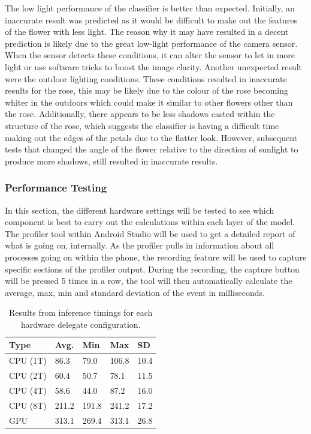 \documentclass{article}
\begin{document}
The low light performance of the classifier is better than expected. Initially, an inaccurate result was predicted as it
would be difficult to make out the features of the flower with less light. The reason why it may have resulted in a 
decent prediction is likely due to the great low-light performance of the camera sensor. When the sensor detects these 
conditions, it can alter the sensor to let in more light or use software tricks to boost the image clarity. Another 
unexpected result were the outdoor lighting conditions. These conditions resulted in inaccurate results for the rose, 
this may be likely due to the colour of the rose becoming whiter in the outdoors which could make it similar to other 
flowers other than the rose. Additionally, there appears to be less shadows casted within the structure of the rose, 
which suggests the classifier is having a difficult time making out the edges of the petals due to the flatter look. 
However, subsequent tests that changed the angle of the flower relative to the direction of sunlight to produce more 
shadows, still resulted in inaccurate results. 

\subsubsection{Performance Testing}

In this section, the different hardware settings will be tested to see which component is best to carry out the 
calculations within each layer of the model. The profiler tool within Android Studio will be used to get a detailed 
report of what is going on, internally. As the profiler pulls in information about all processes going on within the 
phone, the recording feature will be used to capture specific sections of the profiler output. During the recording, 
the capture button will be pressed 5 times in a row, the tool will then automatically calculate the average, max, min 
and standard deviation of the event in milliseconds.

\begin{table}[h!]
    \centering
    \begin{tabular}{ |m{2cm}|m{1.5cm}|m{1.5cm}|m{1.5cm}|m{1.5cm}| }
        \hline
        Type & Avg. & Min & Max & SD \\
        \hline
        CPU (1T) & 86.3 & 79.0 & 106.8 & 10.4 \\
        \hline
        CPU (2T) & 60.4 & 50.7 & 78.1 & 11.5 \\
        \hline
        CPU (4T) & 58.6 & 44.0 & 87.2 & 16.0 \\
        \hline
        CPU (8T) & 211.2 & 191.8 & 241.2 & 17.2 \\
        \hline
        GPU & 313.1 & 269.4 & 313.1 & 26.8 \\
        \hline

        
    \end{tabular}
    \caption{Results from inference timings for each hardware delegate configuration.}
    \label{table:timings}
\end{table}
\end{document}
